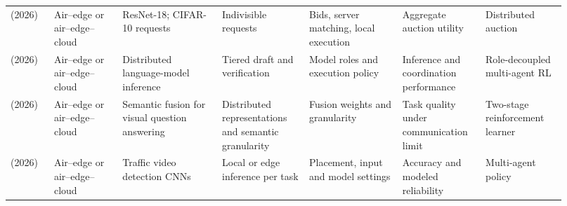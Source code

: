 \begin{longtable}{@{}Y{0.075\linewidth}Y{0.111\linewidth}Y{0.169\linewidth}Y{0.145\linewidth}Y{0.151\linewidth}Y{0.125\linewidth}Y{0.139\linewidth}@{}}
\cite{R0058}\newline\mbox{(2026)} & Air--edge or air--edge--cloud & ResNet-18; CIFAR-10 requests & Indivisible requests & Bids, server matching, local execution & Aggregate auction utility & Distributed auction \\
\cite{R0063}\newline\mbox{(2026)} & Air--edge or air--edge--cloud & Distributed language-model inference & Tiered draft and verification & Model roles and execution policy & Inference and coordination performance & Role-decoupled multi-agent RL \\
\cite{R0107}\newline\mbox{(2026)} & Air--edge or air--edge--cloud & Semantic fusion for visual question answering & Distributed representations and semantic granularity & Fusion weights and granularity & Task quality under communication limit & Two-stage reinforcement learner \\
\cite{R0137}\newline\mbox{(2026)} & Air--edge or air--edge--cloud & Traffic video detection CNNs & Local or edge inference per task & Placement, input and model settings & Accuracy and modeled reliability & Multi-agent policy \\
\end{longtable}\endgroup
